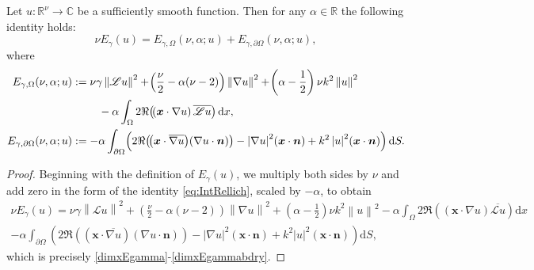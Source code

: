 \documentclass[twoside,11pt]{article}
\def\dimx{\nu }
\def\d{{\mathrm d}}
\def\L{{\mathscr{L}}}
\newcommand{\qp}[1]{\ensuremath{\!\left({#1}\right)}}
\newcommand{\norm}[1]{\ensuremath{\left|#1\right|}}
\newcommand{\Norm}[1]{\ensuremath{\left\|#1\right\|}}
\renewcommand{\vec}[1]{\boldsymbol{#1}}
\def\L{{\mathscr{L}}}
\begin{document}
{\begin{lemma}
  Let $u \colon \mathbb{R}^\dimx \to \mathbb{C}$ be a sufficiently smooth
  function. 
  Then for any $\alpha \in \mathbb{R}$ the following identity
  holds:
  \begin{equation} \label{dimxEgamma}
      \dimx  E_\gamma(u)  =  E_{\gamma,\Omega}(\dimx,\alpha;u)  +  E_{\gamma,\partial\Omega}(\dimx,\alpha;u),
  \end{equation}
  where
  \begin{align}  
     E_{\gamma,\Omega}(\dimx,\alpha;u)
     &:= \dimx \gamma \Norm{\L u}^2
    +
    \qp{\frac{\dimx}{2} - \alpha(\dimx-2)}\Norm{\nabla u}^2
    +
    \qp{\alpha - \frac{1}{2}} \dimx  k^2 \Norm{u}^2 \nonumber\\
    &\hspace{2.4em}
    - 
    \alpha \int_\Omega 2 \Re\qp{\qp{\vec{x} \cdot \nabla u}  \overline{\L u}}    \d x , \label{dimxEgammabulk} \\
    E_{\gamma,\partial\Omega}(\dimx,\alpha;u)
    &:= 
    - 
    \alpha \int_{\partial \Omega} \qp{
      2 \Re\qp{\qp{\vec{x} \cdot \overline{\nabla u}} \qp{\nabla u \cdot \vec{n}}}
      -
      \norm{\nabla u}^2 \qp{\vec{x} \cdot \vec{n}}
      +
      k^2 \norm{u}^2 \qp{\vec{x} \cdot \vec{n}}
    }    \d S .  \label{dimxEgammabdry} 
 \end{align}
\end{lemma}

\begin{proof}
  Beginning with the definition of $E_\gamma(u)$, we {multiply both sides by $\dimx$} and add zero in the form of the identity \eqref{eq:IntRellich}, 
  scaled by $-\alpha$, to obtain
  \begin{multline*}
    \dimx  E_\gamma(u)
    =
    \dimx  \gamma \Norm{\L u}^2
    +
    \qp{\frac{\dimx}{2} - \alpha(\dimx-2)} \Norm{\nabla u}^2
    +
    \qp{\alpha - \frac{1}{2}} \dimx  k^2 \Norm{u}^2 
    -
    \alpha \int_\Omega 2 \Re\qp{\qp{\vec{x} \cdot \nabla u}  \overline{\L u}}    \d x
    \\
    -
    \alpha \int_{\partial \Omega} \qp{
      2 \Re\qp{\qp{\vec{x} \cdot \overline{\nabla u}} \qp{\nabla u \cdot \vec{n}}}
      -
      \norm{\nabla u}^2 \qp{\vec{x} \cdot \vec{n}}
      +
      k^2 \norm{u}^2 \qp{\vec{x} \cdot \vec{n}}
    }    \d S,
  \end{multline*}
  which is precisely \eqref{dimxEgamma}-\eqref{dimxEgammabdry}.
\end{proof}

}
\end{document}

